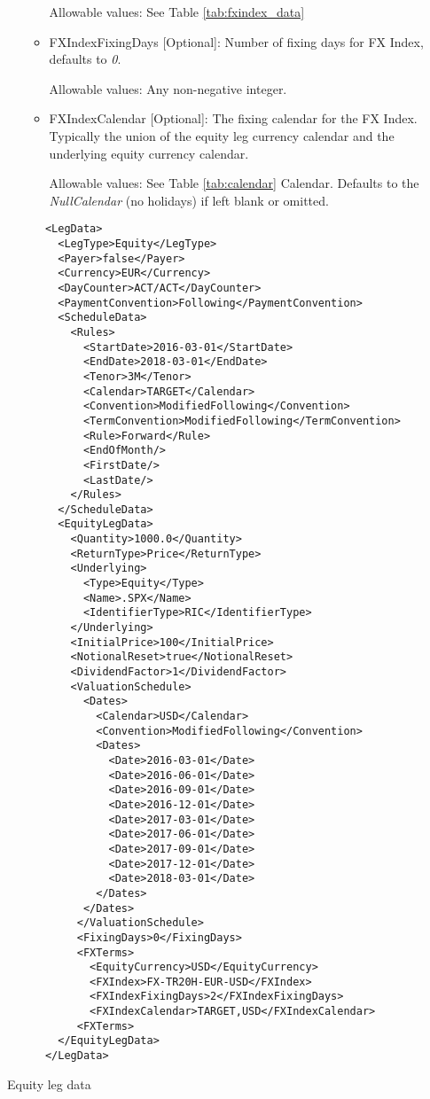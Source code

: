 \begin{itemize}
\begin{itemize}
	Allowable values:  See Table \ref{tab:fxindex_data}

	\item FXIndexFixingDays [Optional]: Number of fixing days for FX Index, defaults to \emph{0}.

	Allowable values: Any non-negative integer.

	\item FXIndexCalendar [Optional]: The fixing calendar for the FX Index. Typically the union of the equity leg currency calendar and the
underlying equity currency calendar.

	Allowable values: See Table \ref{tab:calendar} Calendar. Defaults to the \emph{NullCalendar} (no holidays) if left blank or omitted.
\end{itemize}
\end{itemize}

\begin{listing}[H]
\begin{verbatim}
      <LegData>
        <LegType>Equity</LegType>
        <Payer>false</Payer>
        <Currency>EUR</Currency>
        <DayCounter>ACT/ACT</DayCounter>
        <PaymentConvention>Following</PaymentConvention>
        <ScheduleData>
          <Rules>
            <StartDate>2016-03-01</StartDate>
            <EndDate>2018-03-01</EndDate>
            <Tenor>3M</Tenor>
            <Calendar>TARGET</Calendar>
            <Convention>ModifiedFollowing</Convention>
            <TermConvention>ModifiedFollowing</TermConvention>
            <Rule>Forward</Rule>
            <EndOfMonth/>
            <FirstDate/>
            <LastDate/>
          </Rules>
        </ScheduleData>
        <EquityLegData>
          <Quantity>1000.0</Quantity>
          <ReturnType>Price</ReturnType>
          <Underlying>
            <Type>Equity</Type>
            <Name>.SPX</Name>
            <IdentifierType>RIC</IdentifierType>
          </Underlying>
          <InitialPrice>100</InitialPrice>
          <NotionalReset>true</NotionalReset>
          <DividendFactor>1</DividendFactor>
          <ValuationSchedule>
            <Dates>
              <Calendar>USD</Calendar>
              <Convention>ModifiedFollowing</Convention>
              <Dates>
                <Date>2016-03-01</Date>
                <Date>2016-06-01</Date>
                <Date>2016-09-01</Date>
                <Date>2016-12-01</Date>
                <Date>2017-03-01</Date>
                <Date>2017-06-01</Date>
                <Date>2017-09-01</Date>
                <Date>2017-12-01</Date>
                <Date>2018-03-01</Date>
              </Dates>
            </Dates>
           </ValuationSchedule>
           <FixingDays>0</FixingDays>
           <FXTerms>
             <EquityCurrency>USD</EquityCurrency>
             <FXIndex>FX-TR20H-EUR-USD</FXIndex>
             <FXIndexFixingDays>2</FXIndexFixingDays>
             <FXIndexCalendar>TARGET,USD</FXIndexCalendar>
           <FXTerms>
        </EquityLegData>
      </LegData>
\end{verbatim}
\caption{Equity leg data}
\label{lst:equitylegdata}
\end{listing}
